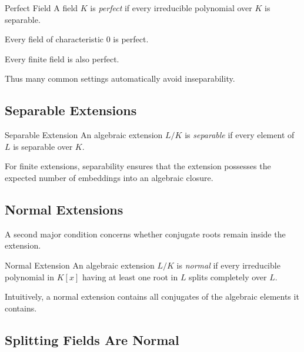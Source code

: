 \begin{definitionbox}{Perfect Field}
A field \(K\) is \emph{perfect} if every irreducible polynomial over \(K\) is
separable.
\end{definitionbox}

Every field of characteristic \(0\) is perfect.

Every finite field is also perfect.

Thus many common settings automatically avoid inseparability.

\subsection{Separable Extensions}
\label{subsec:separable-extensions}

\begin{definitionbox}{Separable Extension}
An algebraic extension \(L/K\) is \emph{separable} if every element of \(L\)
is separable over \(K\).
\end{definitionbox}

For finite extensions, separability ensures that the extension possesses the
expected number of embeddings into an algebraic closure.

\subsection{Normal Extensions}
\label{subsec:normal-extensions}

A second major condition concerns whether conjugate roots remain inside the
extension.

\begin{definitionbox}{Normal Extension}
An algebraic extension \(L/K\) is \emph{normal} if every irreducible
polynomial in \(K[x]\) having at least one root in \(L\) splits completely
over \(L\).
\end{definitionbox}

Intuitively, a normal extension contains all conjugates of the algebraic
elements it contains.

\subsection{Splitting Fields Are Normal}
\label{subsec:splitting-fields-normal}

